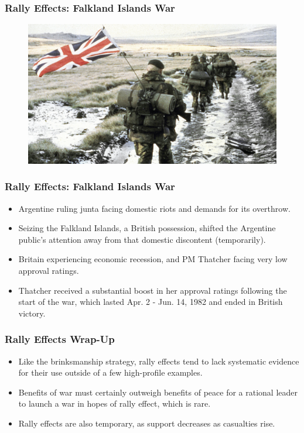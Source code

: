 \documentclass{beamer}
\begin{document}
\begin{frame} 
	\frametitle{\LARGE{Rally Effects: Falkland Islands War}}
	\begin{figure}[ht!]
		\centering
		\includegraphics[width=\textwidth,height=0.9\textheight,keepaspectratio]{Britishtroops.jpg}
	\end{figure}
\end{frame}

\begin{frame} 
	\frametitle{\LARGE{Rally Effects: Falkland Islands War}}
	\begin{itemize}
		\item Argentine ruling junta facing domestic riots and demands for its overthrow. \pause
		\item Seizing the Falkland Islands, a British possession, shifted the Argentine public's attention away from that domestic discontent (temporarily). \pause
		\item Britain experiencing economic recession, and PM Thatcher facing very low approval ratings. \pause
		\item Thatcher received a substantial boost in her approval ratings following the start of the war, which lasted Apr. 2 - Jun. 14, 1982 and ended in British victory.
	\end{itemize}
\end{frame}

\begin{frame} 
	\frametitle{\LARGE{Rally Effects Wrap-Up}}
	\begin{itemize}
		\item Like the brinksmanship strategy, rally effects tend to lack systematic evidence for their use outside of a few high-profile examples. \pause
		\item Benefits of war must certainly outweigh benefits of peace for a rational leader to launch a war in hopes of rally effect, which is rare. \pause
		\item Rally effects are also temporary, as support decreases as casualties rise.
	\end{itemize}
\end{frame}
\end{document}
